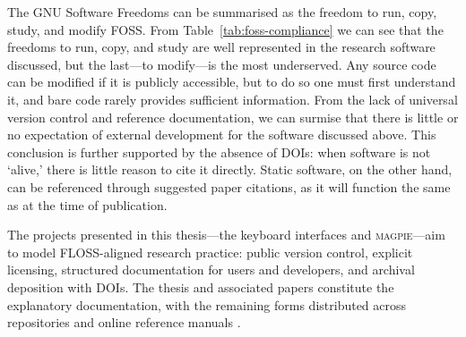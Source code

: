 The GNU Software Freedoms \cite{stallman_free_1996} can be summarised as the
freedom to run, copy, study, and modify FOSS. From
Table~\ref{tab:foss-compliance} we can see that the freedoms to run, copy, and
study are well represented in the research software discussed, but the last---to
modify---is the most underserved. Any source code can be modified if it is
publicly accessible, but to do so one must first understand it, and bare code
rarely provides sufficient information. From the lack of universal version
control and reference documentation, we can surmise that there is little or no
expectation of external development for the software discussed above. This
conclusion is further supported by the absence of DOIs: when software is not
`alive,’ there is little reason to cite it directly. Static software, on the
other hand, can be referenced through suggested paper citations, as it will
function the same as at the time of publication.

The projects presented in this thesis---the keyboard interfaces and
\textsc{magpie}---aim to model FLOSS-aligned research practice: public version
control, explicit licensing, structured documentation for users and developers,
and archival deposition with DOIs. The thesis and associated papers
\cite{hamilton_augmentation_2025, hamilton_magpie_2024} constitute the
explanatory documentation, with the remaining forms distributed across
repositories \cite{hamilton_nemus_2025, hamilton_cad_2025, hamilton_models_2025,
hamilton_firmware_2025, magpie_matlab_2025, magpie_python_2025, magpie_cpp_2025}
and online reference manuals \cite{hamilton_documentation_2025,
hamilton_matlab_2025, hamilton_python_2025}.



